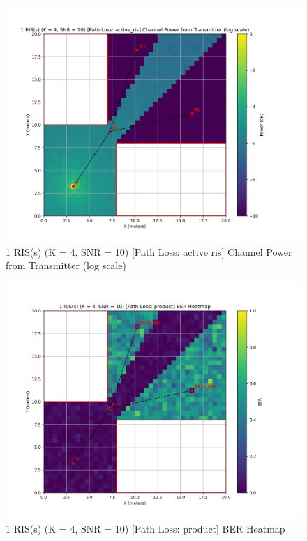 \begin{figure}[H]
  \centering
  \includegraphics[width=0.8\linewidth]{imgs/heatmap-simulations/1 RIS(s) (K = 4, SNR = 10) [Path Loss_ active_ris] Channel Power from Transmitter (log scale).png}
  \caption{1 RIS(s) (K = 4, SNR = 10) [Path Loss: active ris] Channel Power from Transmitter (log scale)}
\end{figure}


\begin{figure}[H]
  \centering
  \includegraphics[width=0.8\linewidth]{imgs/heatmap-simulations/1 RIS(s) (K = 4, SNR = 10) [Path Loss_ product] BER Heatmap.png}
  \caption{1 RIS(s) (K = 4, SNR = 10) [Path Loss: product] BER Heatmap}
\end{figure}

